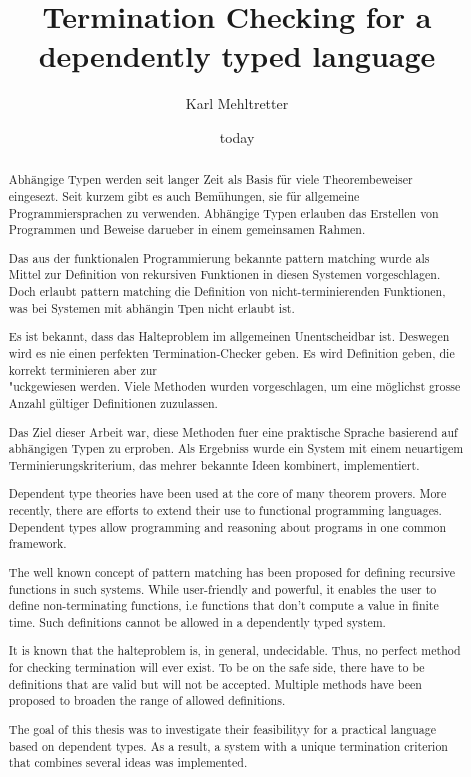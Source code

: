\documentclass[a4paper,11pt,openright]{report}
\theoremstyle{remark}
\begin{document}
\title{Termination Checking for a dependently typed language}
\author{Karl Mehltretter}
\date{today}
\renewcommand{\abstractname}{Abstrakt}
\begin{abstract}
Abh\"angige Typen werden seit langer Zeit als Basis f\"ur viele Theorembeweiser eingesezt.
Seit kurzem gibt es auch Bem\"uhungen, sie f\"ur allgemeine Programmiersprachen zu verwenden.
Abh\"angige Typen erlauben das Erstellen von Programmen und Beweise darueber in einem gemeinsamen Rahmen.

Das aus der funktionalen Programmierung bekannte pattern matching wurde als Mittel zur Definition von
rekursiven Funktionen in diesen Systemen vorgeschlagen.
Doch erlaubt pattern matching die Definition von nicht-terminierenden Funktionen, was bei Systemen mit abh\"angin Tpen nicht erlaubt ist.

Es ist bekannt, dass das Halteproblem im allgemeinen Unentscheidbar ist. 
Deswegen wird es nie einen perfekten Termination-Checker geben. Es wird Definition geben, die korrekt terminieren aber zur\\"uckgewiesen werden.
Viele Methoden wurden vorgeschlagen, um eine m\"oglichst grosse Anzahl g\"ultiger Definitionen zuzulassen.

Das Ziel dieser Arbeit war, diese Methoden fuer eine praktische Sprache basierend auf abh\"angigen Typen zu erproben.
Als Ergebniss wurde ein System mit einem neuartigem Terminierungskriterium, das mehrer bekannte Ideen kombinert, implementiert.
\end{abstract}
\newpage

\renewcommand{\abstractname}{Abstract}
\begin{abstract}
Dependent type theories have been used at the core of many theorem provers.
More recently, there are efforts to extend their use to functional programming languages.
Dependent types allow programming and reasoning about programs in one common framework.

The well known concept of pattern matching has been proposed for defining recursive functions in such systems.
While user-friendly and powerful, it enables the user to define non-terminating functions, i.e functions that don't compute a value in finite time. Such definitions cannot be allowed in a dependently typed system. 

It is known that the halteproblem is, in general, undecidable. Thus, no perfect method for checking termination will ever exist. To be on the safe side, there have to be definitions that are valid but will not be accepted.
Multiple methods have been proposed to broaden the range of allowed definitions.

The goal of this thesis was to investigate their feasibilityy for a practical language based on dependent types.
As a result, a system with a unique termination criterion that combines several ideas was implemented.
\end{abstract}
\tableofcontents






\end{document}
